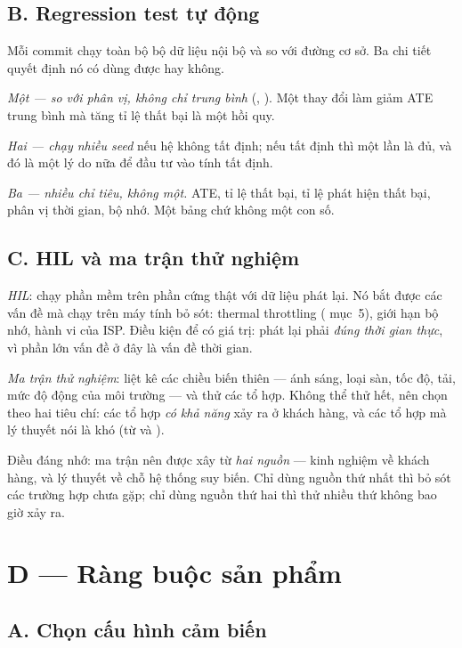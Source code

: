 \documentclass[../../vslam.tex]{subfiles}
\begin{document}
\subsection{B. Regression test tự động}

Mỗi commit chạy toàn bộ bộ dữ liệu nội bộ và so với đường cơ sở. Ba chi tiết quyết định nó có dùng được hay không.

\emph{Một --- so với phân vị, không chỉ trung bình} (, ). Một thay đổi làm giảm ATE trung bình mà tăng tỉ lệ thất bại là một hồi quy.

\emph{Hai --- chạy nhiều seed} nếu hệ không tất định; nếu tất định thì một lần là đủ, và đó là một lý do nữa để đầu tư vào tính tất định.

\emph{Ba --- nhiều chỉ tiêu, không một.} ATE, tỉ lệ thất bại, tỉ lệ phát hiện thất bại, phân vị thời gian, bộ nhớ. Một bảng chứ không một con số.

\subsection{C. HIL và ma trận thử nghiệm}

\emph{HIL}: chạy phần mềm trên phần cứng thật với dữ liệu phát lại. Nó bắt được các vấn đề mà chạy trên máy tính bỏ sót: thermal throttling ( mục~5), giới hạn bộ nhớ, hành vi của ISP. Điều kiện để có giá trị: phát lại phải \emph{đúng thời gian thực}, vì phần lớn vấn đề ở đây là vấn đề thời gian.

\emph{Ma trận thử nghiệm}: liệt kê các chiều biến thiên --- ánh sáng, loại sàn, tốc độ, tải, mức độ động của môi trường --- và thử các tổ hợp. Không thể thử hết, nên chọn theo hai tiêu chí: các tổ hợp \emph{có khả năng} xảy ra ở khách hàng, và các tổ hợp mà lý thuyết nói là khó (từ  và ).

Điều đáng nhớ: ma trận nên được xây từ \emph{hai nguồn} --- kinh nghiệm về khách hàng, và lý thuyết về chỗ hệ thống suy biến. Chỉ dùng nguồn thứ nhất thì bỏ sót các trường hợp chưa gặp; chỉ dùng nguồn thứ hai thì thử nhiều thứ không bao giờ xảy ra.

\section{D --- Ràng buộc sản phẩm}

\subsection{A. Chọn cấu hình cảm biến}
\end{document}

